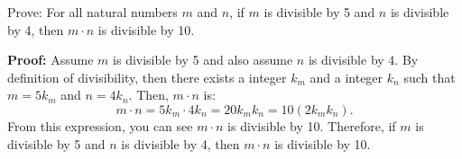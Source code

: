\begin{questions}

\ifprintanswers
\else
{}





\fi


 Prove: For all natural numbers $m$ and $n$, if $m$ is divisible by 5 and $n$ is divisible by 4, then $m\cdot n$ is divisible by 10.
    \ifprintanswers
        \vspace{-10pt}
    \fi
  \begin{solution} \textbf{Proof:} Assume $m$ is divisible by 5 and also assume $n$ is divisible by 4.  By definition of divisibility, then there exists a integer $k_m$ and a integer $k_n$ such that $m = 5k_m$ and $n=4k_n$.  Then, $m\cdot n$ is:
    \[ m\cdot n = 5k_m \cdot 4k_n = 20k_mk_n = 10(2k_mk_n). \]
  From this expression, you can see $m\cdot n$ is divisible by 10.  Therefore, if $m$ is divisible by 5 and $n$ is divisible by 4, then $m \cdot n$ is divisible by 10.
  \end{solution}




\end{questions}
